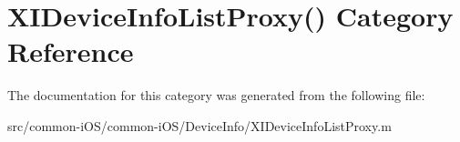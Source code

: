 \hypertarget{category_x_i_device_info_list_proxy_07_08}{}\section{X\+I\+Device\+Info\+List\+Proxy() Category Reference}
\label{category_x_i_device_info_list_proxy_07_08}


The documentation for this category was generated from the following file\+:\begin{DoxyCompactItemize}
\item 
src/common-\/i\+O\+S/common-\/i\+O\+S/\+Device\+Info/X\+I\+Device\+Info\+List\+Proxy.\+m\end{DoxyCompactItemize}
